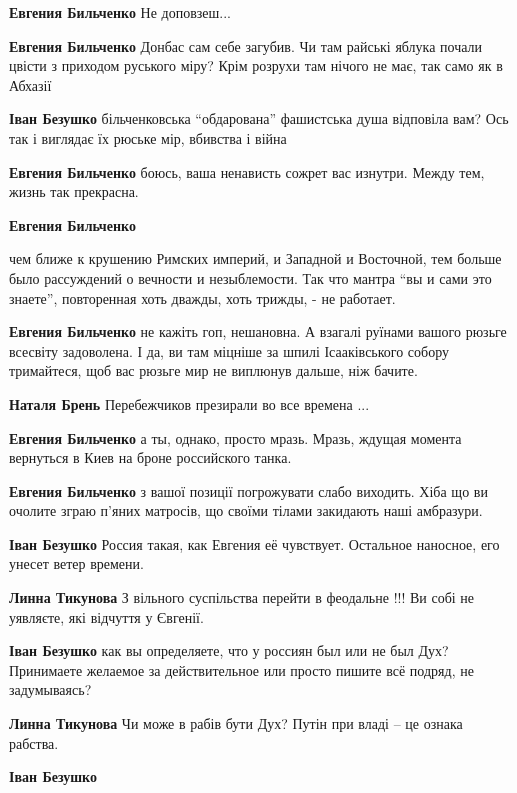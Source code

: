 \begin{itemize}
\begin{itemize}
\textbf{Евгения Бильченко} Не доповзеш...

\textbf{Евгения Бильченко} Донбас сам себе загубив. Чи там райські яблука почали цвісти з приходом руського міру? Крім розрухи там нічого не має, так само як в Абхазії

\textbf{Іван Безушко} більченковська \enquote{обдарована} фашистська душа відповіла вам? Ось так і виглядає їх рюське мір, вбивства і війна

\textbf{Евгения Бильченко} боюсь, ваша ненависть сожрет вас изнутри. Между тем, жизнь так прекрасна.

\textbf{Евгения Бильченко} 

чем ближе к крушению Римских империй, и Западной и Восточной, тем больше было
рассуждений о вечности и незыблемости. Так что мантра \enquote{вы и сами это знаете},
повторенная хоть дважды, хоть трижды, - не работает.

\textbf{Евгения Бильченко} не кажіть гоп, нешановна. А взагалі руїнами вашого рюзьге всесвіту задоволена. І да, ви там міцніше за шпилі Ісааківського собору тримайтеся, щоб вас рюзьге мир не виплюнув дальше, ніж бачите.

\textbf{Наталя Брень} Перебежчиков презирали во все времена ...

\textbf{Евгения Бильченко} а ты, однако, просто мразь. Мразь, ждущая момента вернуться в Киев на броне российского танка.

\textbf{Евгения Бильченко} з вашої позиції погрожувати слабо виходить. Хіба що ви очолите зграю п'яних матросів, що своїми тілами закидають наші амбразури.

\textbf{Іван Безушко} Россия такая, как Евгения её чувствует. Остальное наносное, его унесет ветер времени.

\textbf{Линна Тикунова} З вільного суспільства перейти в феодальне !!! Ви собі не уявляєте, які відчуття у Євгенії.

\textbf{Іван Безушко} как вы определяете, что у россиян был или не был Дух? Принимаете желаемое за действительное или просто пишите всё подряд, не задумываясь?

\textbf{Линна Тикунова} Чи може в рабів бути Дух? Путін при владі – це ознака рабства.

\textbf{Іван Безушко} 


\end{itemize}
\end{itemize}

